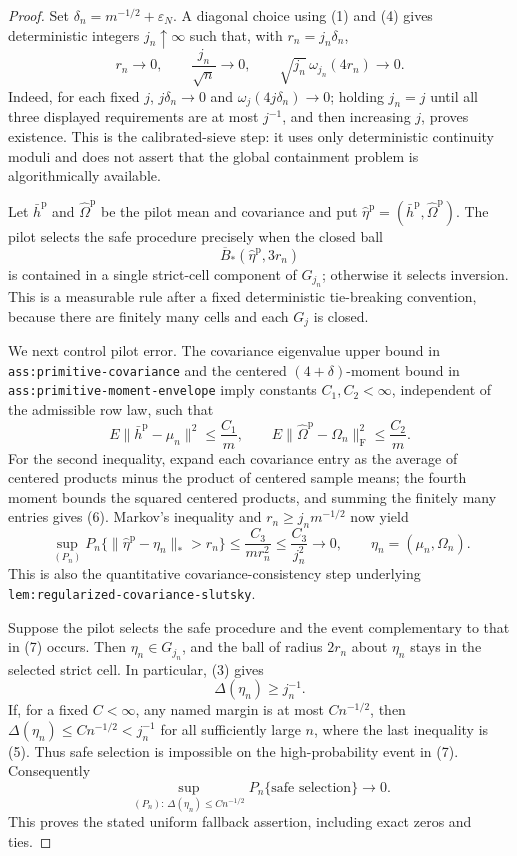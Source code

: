 \documentclass{article}
\begin{document}
\begin{proof}
Set \(\delta_n=m^{-1/2}+\varepsilon_N\).  A diagonal choice using (1) and (4) gives deterministic integers \(j_n\uparrow\infty\) such that, with \(r_n=j_n\delta_n\),
\[
 r_n\to0,
 \qquad \frac{j_n}{\sqrt n}\to0,
 \qquad
 \sqrt{j_n}\,\omega_{j_n}(4r_n)\to0. \tag{5}
\]
Indeed, for each fixed \(j\), \(j\delta_n\to0\) and \(\omega_j(4j\delta_n)\to0\); holding \(j_n=j\) until all three displayed requirements are at most \(j^{-1}\), and then increasing \(j\), proves existence.  This is the calibrated-sieve step: it uses only deterministic continuity moduli and does not assert that the global containment problem is algorithmically available.

Let \(\bar h^{\mathrm p}\) and \(\widehat\Omega^{\mathrm p}\) be the pilot mean and covariance and put \(\widehat\eta^{\mathrm p}=(\bar h^{\mathrm p},\widehat\Omega^{\mathrm p})\).  The pilot selects the safe procedure precisely when the closed ball
\[
 \overline B_*(\widehat\eta^{\mathrm p},3r_n)
\]
is contained in a single strict-cell component of \(G_{j_n}\); otherwise it selects inversion.  This is a measurable rule after a fixed deterministic tie-breaking convention, because there are finitely many cells and each \(G_j\) is closed.

We next control pilot error.  The covariance eigenvalue upper bound in \texttt{ass:primitive-covariance} and the centered \((4+\delta)\)-moment bound in \texttt{ass:primitive-moment-envelope} imply constants \(C_1,C_2<\infty\), independent of the admissible row law, such that
\[
 E\|\bar h^{\mathrm p}-\mu_n\|^2\le \frac{C_1}{m},
 \qquad
 E\|\widehat\Omega^{\mathrm p}-\Omega_n\|_{\mathrm F}^2\le \frac{C_2}{m}. \tag{6}
\]
For the second inequality, expand each covariance entry as the average of centered products minus the product of centered sample means; the fourth moment bounds the squared centered products, and summing the finitely many entries gives (6).  Markov's inequality and \(r_n\ge j_nm^{-1/2}\) now yield
\[
 \sup_{(P_n)}P_n\{\|\widehat\eta^{\mathrm p}-\eta_n\|_*>r_n\}
 \le \frac{C_3}{m r_n^2}
 \le \frac{C_3}{j_n^2}\longrightarrow0,
 \qquad \eta_n=(\mu_n,\Omega_n). \tag{7}
\]
This is also the quantitative covariance-consistency step underlying \texttt{lem:regularized-covariance-slutsky}.

Suppose the pilot selects the safe procedure and the event complementary to that in (7) occurs.  Then \(\eta_n\in G_{j_n}\), and the ball of radius \(2r_n\) about \(\eta_n\) stays in the selected strict cell.  In particular, (3) gives
\[
 \Delta(\eta_n)\ge j_n^{-1}. \tag{8}
\]
If, for a fixed \(C<\infty\), any named margin is at most \(Cn^{-1/2}\), then \(\Delta(\eta_n)\le Cn^{-1/2}<j_n^{-1}\) for all sufficiently large \(n\), where the last inequality is (5).  Thus safe selection is impossible on the high-probability event in (7).  Consequently
\[
 \sup_{(P_n):\,\Delta(\eta_n)\le Cn^{-1/2}}
 P_n\{\text{safe selection}\}\longrightarrow0. \tag{9}
\]
This proves the stated uniform fallback assertion, including exact zeros and ties.


\end{proof}
\end{document}
